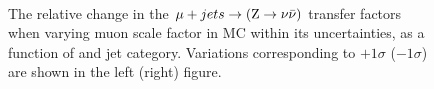 \begin{figure}[!h]
  \centering
   ~~
  \\

  \caption{\label{fig:tfSyst_muon scale factor_muToZinv} The relative change in
  the $\mj \rightarrow (\znunu)$ transfer
  factors when varying muon scale factor in MC within its uncertainties, as a function of \scalht and jet category. 
  Variations corresponding to $+1\sigma$ ($-1\sigma$) are shown in the left (right) figure. 
  }
\end{figure}

